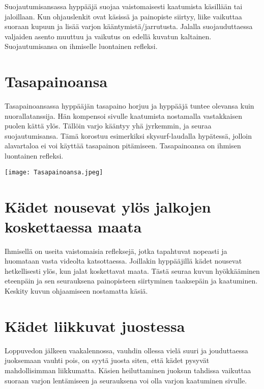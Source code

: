 Suojautumisansassa hyppääjä suojaa vaistomaisesti kaatumista käsillään tai jaloillaan. Kun ohjauslenkit ovat käsissä ja painopiste siirtyy, liike vaikuttaa suoraan kupuun ja lisää varjon kääntymistä/jarrutusta. Jalalla suojauduttaessa valjaiden asento muuttuu ja vaikutus on edellä kuvatun kaltainen. Suojautumisansa on ihmiselle luontainen refleksi. 

\section{ Tasapainoansa }
\label{laskeutumisvirheet-tasapainoansa}


Tasapainoansassa hyppääjän tasapaino horjuu ja hyppääjä tuntee olevansa kuin nuorallatanssija. Hän kompensoi sivulle kaatumista nostamalla vastakkaisen puolen kättä ylös. Tällöin varjo kääntyy yhä jyrkemmin, ja seuraa suojautumisansa. Tämä korostuu esimerkiksi skysurf-laudalla hypätessä, jolloin alavartaloa ei voi käyttää tasapainon pitämiseen. Tasapainoansa on ihmisen luontainen refleksi. 


\begin{Figure}\centering\texttt{[image: Tasapainoansa.jpeg]}\end{Figure}  

\section{ Kädet nousevat ylös jalkojen koskettaessa maata }
\label{laskeutumisvirheet-kadet-nousevat-ylos-jalkojen-koskettaessa-maata}


Ihmisellä on useita vaistomaisia refleksejä, jotka tapahtuvat nopeasti ja huomataan vasta videolta katsottaessa. Joillakin hyppääjillä kädet nousevat hetkellisesti ylös, kun jalat koskettavat maata. Tästä seuraa kuvun hyökkääminen eteenpäin ja sen seurauksena painopisteen siirtyminen taaksepäin ja kaatuminen. Keskity kuvun ohjaamiseen nostamatta käsiä. 

\section{ Kädet liikkuvat juostessa }
\label{laskeutumisvirheet-kadet-liikkuvat-juostessa}


Loppuvedon jälkeen vaakalennossa, vauhdin ollessa vielä suuri ja jouduttaessa juoksemaan vauhti pois, on syytä juosta siten, että kädet pysyvät mahdollisimman liikkumatta. Käsien heiluttaminen juoksun tahdissa vaikuttaa suoraan varjon lentämiseen ja seurauksena voi olla varjon kaatuminen sivulle. 


